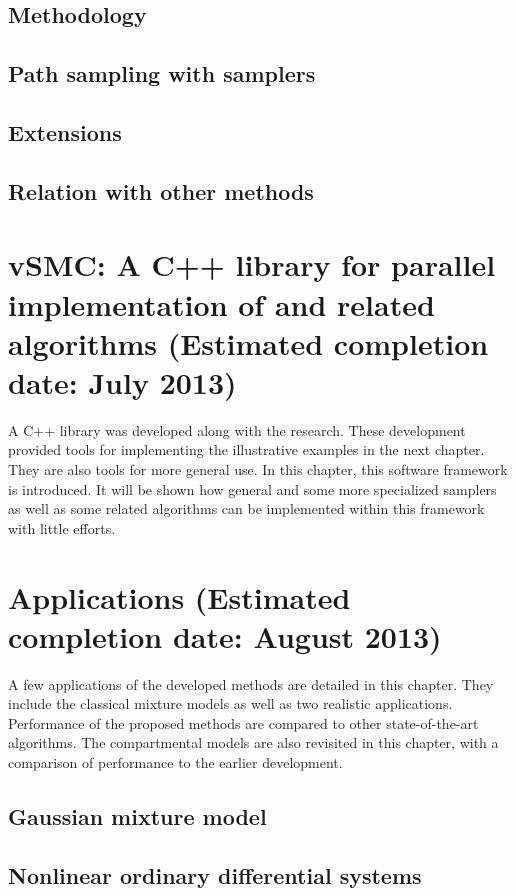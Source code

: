 \documentclass[11pt, bib, fontset = Minion]{marticle}
\def\finish#1{(Estimated completion date: #1 2013)}
\begin{document}
\subsection{Methodology}

\subsection{Path sampling with \smc samplers}

\subsection{Extensions}

\subsection{Relation with other methods}

\section{vSMC: A C++ library for parallel implementation of \smc and
  related algorithms \finish{July}}

A C++ library was developed along with the research. These development
provided tools for implementing the illustrative examples in the next chapter.
They are also tools for more general use. In this chapter, this software
framework is introduced. It will be shown how general and some more
specialized \smc samplers as well as some related algorithms can be
implemented within this framework with little efforts.

\section{Applications \finish{August}}

A few applications of the developed methods are detailed in this chapter. They
include the classical mixture models as well as two realistic applications.
Performance of the proposed methods are compared to other state-of-the-art
algorithms. The \pet compartmental models are also revisited in this chapter,
with a comparison of performance to the earlier development.

\subsection{Gaussian mixture model}

\subsection{Nonlinear ordinary differential systems}
\end{document}
